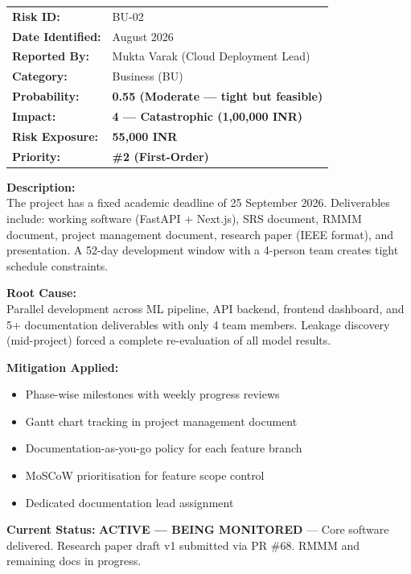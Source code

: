 \documentclass[11pt, a4paper]{article}
\newcommand{\wmark}{\textcolor{warning}{\ding{115}}}
\begin{document}
\begin{risksheet}

\begin{tabular}{@{}p{3.5cm}p{10cm}@{}}
\textbf{Risk ID:} & BU-02 \\[0.3em]
\textbf{Date Identified:} & August 2026 \\[0.3em]
\textbf{Reported By:} & Mukta Varak (Cloud Deployment Lead) \\[0.3em]
\textbf{Category:} & Business (BU) \\[0.3em]
\textbf{Probability:} & \textcolor{medrisk}{\textbf{0.55 (Moderate --- tight but feasible)}} \\[0.3em]
\textbf{Impact:} & \textcolor{highrisk}{\textbf{4 --- Catastrophic (1,00,000 INR)}} \\[0.3em]
\textbf{Risk Exposure:} & \textcolor{highrisk}{\textbf{55,000 INR}} \\[0.3em]
\textbf{Priority:} & \textbf{\#2 (First-Order)} \\
\end{tabular}

\vspace{0.5em}
\textbf{Description:}\\
The project has a fixed academic deadline of 25 September 2026. Deliverables include: working software (FastAPI + Next.js), SRS document, RMMM document, project management document, research paper (IEEE format), and presentation. A 52-day development window with a 4-person team creates tight schedule constraints.

\vspace{0.5em}
\textbf{Root Cause:}\\
Parallel development across ML pipeline, API backend, frontend dashboard, and 5+ documentation deliverables with only 4 team members. Leakage discovery (mid-project) forced a complete re-evaluation of all model results.

\vspace{0.5em}
\textbf{Mitigation Applied:}
\begin{itemize}[leftmargin=*, nosep]
    \item Phase-wise milestones with weekly progress reviews
    \item Gantt chart tracking in project management document
    \item Documentation-as-you-go policy for each feature branch
    \item MoSCoW prioritisation for feature scope control
    \item Dedicated documentation lead assignment
\end{itemize}

\vspace{0.5em}
\textbf{Current Status:} \wmark{} \textcolor{warning}{\textbf{ACTIVE --- BEING MONITORED}} --- Core software delivered. Research paper draft v1 submitted via PR \#68. RMMM and remaining docs in progress.
\end{risksheet}
\end{document}
